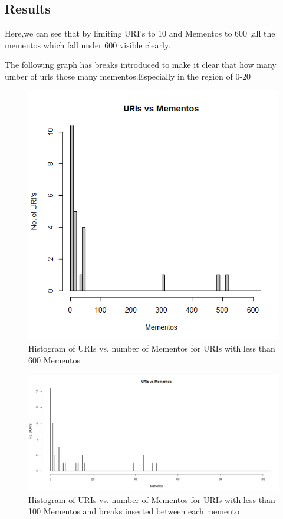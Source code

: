 \documentclass[letterpaper,11pt]{article}
\begin{document}
\subsection{Results}
Here,we can see that by limiting URI's to 10 and Mementos to 600 ,all the mementos which fall under 600 visible clearly.


The following graph has breaks introduced to make it clear that how many umber of urls those many mementos.Especially in the region of 0-20
\begin{figure}
\includegraphics[scale=0.5]{plot1.png}
\caption{Histogram of URIs vs. number of Mementos for URIs with less than 600 Mementos }
\label{Hist 2}
\end{figure}
\begin{figure}
\includegraphics[scale=0.3]{plot3.png}
\caption{Histogram of URIs vs. number of Mementos for URIs with less than 100 Mementos and breaks inserted between each memento }
\label{Hist 3}
\end{figure}
\end{document}
